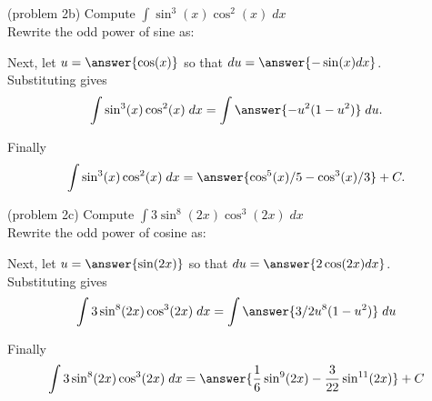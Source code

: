 \documentclass[handout]{ximera}
\begin{document}
\begin{problem}{\color{gray}(problem 2b)} 
Compute $\displaystyle{\int \sin^3(x)\cos^2(x) \; dx}$\\

Rewrite the odd power of sine as:

\begin{multipleChoice}
\end{multipleChoice}

Next, let $u = \answer{\cos(x)}$ so that $du = \answer{-\sin(x) dx}$.\\

Substituting gives
\[
\int \sin^3(x)\cos^2(x) \; dx= \int \answer{-u^2(1-u^2)} \; du.
\]

Finally
\[
\int \sin^3(x)\cos^2(x) \; dx= \answer{\cos^5(x)/5 - \cos^3(x)/3} + C.
\]

\end{problem}



\begin{problem}{\color{gray}(problem 2c)}
Compute $\displaystyle{\int 3\sin^8(2x)\cos^3(2x) \; dx}$\\

Rewrite the odd power of cosine as:

\begin{multipleChoice}
\end{multipleChoice}

Next, let $u = \answer{\sin(2x)}$ so that $du = \answer{2\cos(2x) dx}$.\\

Substituting gives
\[
\int 3\sin^8(2x)\cos^3(2x) \; dx= \int \answer{3/2 u^8(1-u^2)} \; du
\]

Finally
\[
\int 3\sin^8(2x)\cos^3(2x) \; dx= \answer{\frac16 \sin^9(2x)- \frac{3}{22} \sin^{11}(2x)} + C
\]
\end{problem}
\end{document}
